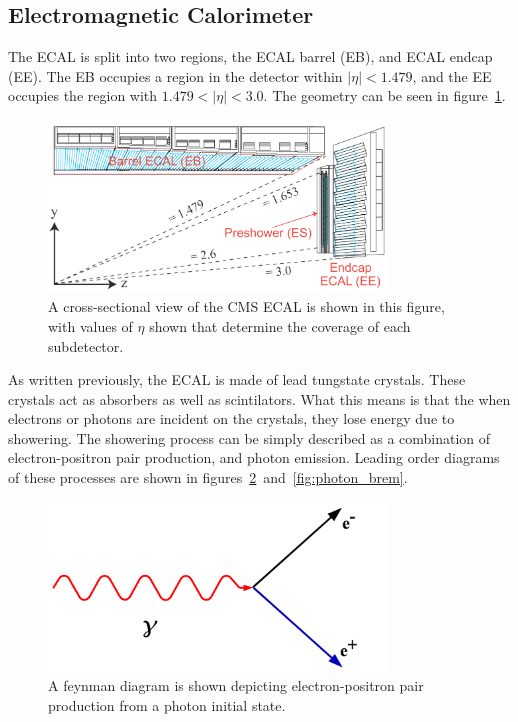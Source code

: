 \subsection{Electromagnetic Calorimeter}
\label {subs:ECAL}
The ECAL is split into two regions, the ECAL barrel (EB), and ECAL endcap (EE).
The EB occupies a region in the detector within $|\eta| < 1.479$, and the EE occupies the region with $1.479 < |\eta| < 3.0$.
The geometry can be seen in figure~\ref{fig:ecal_eta}.

\begin{figure}[!htb]
\begin{center}
\includegraphics[width=0.8\textwidth]{cms/figs/Figures_Experimental_Apparatus_ECALRapidity.pdf}
\caption{ A cross-sectional view of the CMS ECAL is shown in this figure, with values of $\eta$ shown that determine the coverage of each subdetector.
\label{fig:ecal_eta}
}
\end{center}
\end{figure}

\clearpage

As written previously, the ECAL is made of lead tungstate crystals.
These crystals act as absorbers as well as scintilators.
What this means is that the when electrons or photons are incident on the crystals, they lose energy due to showering.
The showering process can be simply described as a combination of electron-positron pair production, and photon emission.
Leading order diagrams of these processes are shown in figures~\ref{fig:pair_production}~and~\ref{fig:photon_brem}.

\begin{figure}[!ht]
\begin{center}
\includegraphics[width=0.8\textwidth]{cms/figs/Pair_Production.png}
\caption{ A feynman diagram is shown depicting electron-positron pair production from a photon initial state.
\label{fig:pair_production}
}
\end{center}
\end{figure}

